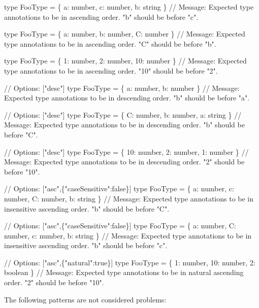 \begin{DoxyCode}
type FooType = \{ a: number, c: number, b: string \}
// Message: Expected type annotations to be in ascending order. "b" should be before "c".

type FooType = \{ a: number, b: number, C: number \}
// Message: Expected type annotations to be in ascending order. "C" should be before "b".

type FooType = \{ 1: number, 2: number, 10: number \}
// Message: Expected type annotations to be in ascending order. "10" should be before "2".

// Options: ["desc"]
type FooType = \{ a: number, b: number \}
// Message: Expected type annotations to be in descending order. "b" should be before "a".

// Options: ["desc"]
type FooType = \{ C: number, b: number, a: string \}
// Message: Expected type annotations to be in descending order. "b" should be before "C".

// Options: ["desc"]
type FooType = \{ 10: number, 2: number, 1: number \}
// Message: Expected type annotations to be in descending order. "2" should be before "10".

// Options: ["asc",\{"caseSensitive":false\}]
type FooType = \{ a: number, c: number, C: number, b: string \}
// Message: Expected type annotations to be in insensitive ascending order. "b" should be before "C".

// Options: ["asc",\{"caseSensitive":false\}]
type FooType = \{ a: number, C: number, c: number, b: string \}
// Message: Expected type annotations to be in insensitive ascending order. "b" should be before "c".

// Options: ["asc",\{"natural":true\}]
type FooType = \{ 1: number, 10: number, 2: boolean \}
// Message: Expected type annotations to be in natural ascending order. "2" should be before "10".
\end{DoxyCode}


The following patterns are not considered problems\+:


